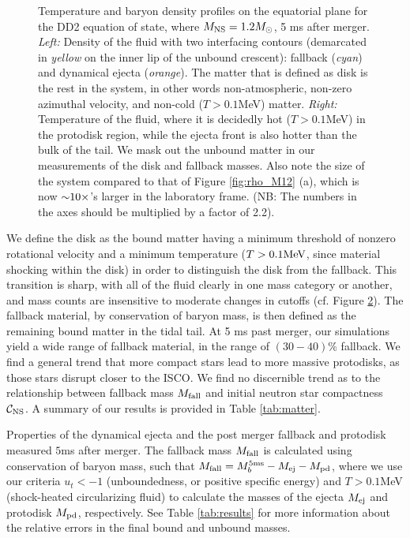 \begin{figure}
\begin{subfigure}[b]{0.475\textwidth}
		\label{fig:temp_M12_DD2_5ms}
		\centering
	\end{subfigure}
	\caption[Temperature and density profiles on equatorial plane for DD2 $1.2 M_\odot$ model]{
		Temperature and baryon density profiles on the equatorial plane for the DD2 equation of state, where $M_{\rm NS} = 1.2 M_{\odot}$, 5 ms after merger.
		\textit{Left:} Density of the fluid with two interfacing contours (demarcated in \textit{yellow} on the inner lip of the unbound crescent): fallback (\textit{cyan}) and dynamical ejecta (\textit{orange}).  The matter that is defined as disk is the rest in the system, in other words non-atmospheric, non-zero azimuthal velocity, and non-cold ($T > 0.1$MeV) matter.
		\textit{Right:} Temperature of the fluid, where it is decidedly hot ($T>0.1$MeV) in the protodisk region, while the ejecta front is also hotter than the bulk of the tail.  We mask out the unbound matter in our measurements of the disk and fallback masses.  Also note the size of the system compared to that of Figure \ref{fig:rho_M12} (a), which is now $\mathord{\sim} 10 \times$'s larger in the laboratory frame.
		(NB: The numbers in the axes should be multiplied by a factor of 2.2).
	}
	\label{fig:dd2_m12_5ms}
\end{figure}

We define the disk as the bound matter having a minimum threshold of nonzero rotational velocity and a minimum temperature ($T>0.1 {\rm MeV}$, since material shocking within the disk) in order to distinguish the disk from the fallback.
This transition is sharp, with all of the fluid clearly in one mass category or another, and mass counts are insensitive to moderate changes in cutoffs (cf. Figure \ref{fig:dd2_m12_5ms}).
The fallback material, by conservation of baryon mass, is then defined as the  remaining bound matter in the tidal tail.
At 5 ms past merger, our simulations yield a wide range of fallback material, in the range of $(30 - 40)\%$ fallback.
We find a general trend that more compact stars lead to more massive protodisks, as those stars disrupt closer to the ISCO.
We find no discernible trend as to the relationship between fallback mass $M_{\rm fall}$ and initial neutron star compactness $\mathcal{C}_{\rm NS}$.
A summary of our results is provided in Table \ref{tab:matter}.

\begin{table}
	\begin{center}
		\caption[Baryon mass bookkeeping]{
			Properties of the dynamical ejecta and the post merger fallback and protodisk measured $5$ms after merger.  The fallback mass $M_{\rm fall}$ is calculated using conservation of baryon mass, such that $M_{\rm fall} = M_b^{5 {\rm ms}} - M_{\rm ej} -M_{\rm pd}$, where we use our criteria $u_t < -1$ (unboundedness, or positive specific energy) and $T > 0.1$MeV (shock-heated circularizing fluid) to calculate the masses of the ejecta $M_{\rm ej}$ and protodisk $M_{\rm pd}$, respectively.  See Table \ref{tab:results} for more information about the relative errors in the final bound and unbound masses.
		}
		\label{tab:matter}
		{
			
		}
	\end{center}
\end{table}


